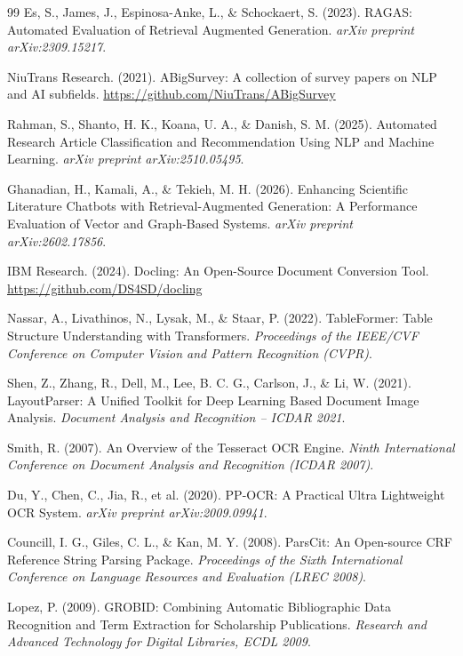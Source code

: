 \documentclass[12pt,a4paper]{report}
\begin{document}
\begin{thebibliography}{99}
Es, S., James, J., Espinosa-Anke, L., \& Schockaert, S. (2023). RAGAS:
Automated Evaluation of Retrieval Augmented Generation. \textit{arXiv preprint
arXiv:2309.15217}.

NiuTrans Research. (2021). ABigSurvey: A collection of survey papers on NLP and
AI subfields. \url{https://github.com/NiuTrans/ABigSurvey}

Rahman, S., Shanto, H. K., Koana, U. A., \& Danish, S. M. (2025). Automated
Research Article Classification and Recommendation Using NLP and Machine
Learning. \textit{arXiv preprint arXiv:2510.05495}.


Ghanadian, H., Kamali, A., \& Tekieh, M. H. (2026). Enhancing Scientific
Literature Chatbots with Retrieval-Augmented Generation: A Performance
Evaluation of Vector and Graph-Based Systems. \textit{arXiv preprint
arXiv:2602.17856}.

IBM Research. (2024). Docling: An Open-Source Document Conversion Tool.
\url{https://github.com/DS4SD/docling}

Nassar, A., Livathinos, N., Lysak, M., \& Staar, P. (2022). TableFormer:
Table Structure Understanding with Transformers. \textit{Proceedings of the
IEEE/CVF Conference on Computer Vision and Pattern Recognition (CVPR)}.

Shen, Z., Zhang, R., Dell, M., Lee, B. C. G., Carlson, J., \& Li, W. (2021).
LayoutParser: A Unified Toolkit for Deep Learning Based Document Image
Analysis. \textit{Document Analysis and Recognition -- ICDAR 2021}.

Smith, R. (2007). An Overview of the Tesseract OCR Engine. \textit{Ninth
International Conference on Document Analysis and Recognition (ICDAR 2007)}.

Du, Y., Chen, C., Jia, R., et al. (2020). PP-OCR: A Practical Ultra
Lightweight OCR System. \textit{arXiv preprint arXiv:2009.09941}.

Councill, I. G., Giles, C. L., \& Kan, M. Y. (2008). ParsCit: An Open-source
CRF Reference String Parsing Package. \textit{Proceedings of the Sixth
International Conference on Language Resources and Evaluation (LREC 2008)}.

Lopez, P. (2009). GROBID: Combining Automatic Bibliographic Data Recognition
and Term Extraction for Scholarship Publications. \textit{Research and Advanced
Technology for Digital Libraries, ECDL 2009}.


\end{thebibliography}
\end{document}

